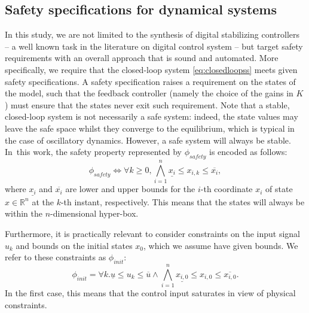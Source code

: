 \documentclass[runningheads,a4paper]{llncs}
\newcommand{\addtodo}[1]{{\color{red} TODO: #1}}
\begin{document}
\subsection{Safety specifications for dynamical systems}
\label{ssec:safety}

In this study, we are not limited to the synthesis of digital stabilizing
controllers -- a well known task in the literature on digital control system
-- but target safety requirements with an overall approach that is sound and
automated.  More specifically, we require that the closed-loop system
\eqref{eq:closedloopss} meets given safety specifications.  A safety
specification raises a requirement on the states of the model, such that the
feedback controller (namely the choice of the gains in $K$) must ensure that
the states never exit such requirement.  Note that a stable, closed-loop
system is not necessarily a safe system: indeed, the state values may leave
the safe space whilst they converge to the equilibrium, which is typical in
the case of oscillatory dynamics.  However, a safe system will always be
stable.  In~this work, the safety property represented by $\phi_{safety}$ is
encoded as follows:
%
\begin{equation}
\label{eq:safetyliteral}
\phi_{safety}\iff \forall k\geq 0, \bigwedge_{i=1}^{n}{\underline{x_{i}} \leq x_{i,k} \leq \overline{x_{i}}},
\end{equation}
%
%
where $\underline{x_{i}}$ and $\overline{x_{i}}$ are lower and upper bounds
for the $i$-th coordinate $x_{i}$ of state $x\in \mathbb R^n$ at the $k$-th
instant, respectively.  This means that the states will always be within the
$n$-dimensional hyper-box.

Furthermore, it is practically relevant to consider constraints on the input
signal $u_{k}$ and bounds on the initial states $x_0$,
which we assume have given bounds. %
We refer to these constraints as $\phi_{init}$:
$$\phi_{init} = {\forall k.\underline{u} \leq u_{k} \leq \overline{u}} 
\wedge \bigwedge_{i=1}^{n} \underline{x_{i,0}} \leq x_{i,0} \leq \overline{x_{i,0}}.$$  
In the first case, this means that the control input saturates in view of
physical constraints.

\end{document}
